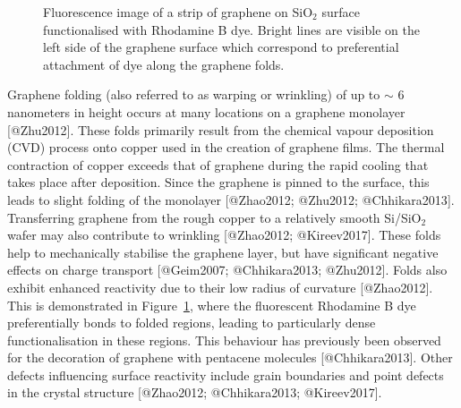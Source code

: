\documentclass[
  letterpaper,
  DIV=11,
  numbers=noendperiod]{scrartcl}
\begin{document}
\begin{figure}


\caption{\label{fig-graphene-folds}Fluorescence image of a strip of
graphene on SiO\(_2\) surface functionalised with Rhodamine B dye.
Bright lines are visible on the left side of the graphene surface which
correspond to preferential attachment of dye along the graphene folds.}

\end{figure}%

Graphene folding (also referred to as warping or wrinkling) of up to
\(\sim\) 6 nanometers in height occurs at many locations on a graphene
monolayer {[}@Zhu2012{]}. These folds primarily result from the chemical
vapour deposition (CVD) process onto copper used in the creation of
graphene films. The thermal contraction of copper exceeds that of
graphene during the rapid cooling that takes place after deposition.
Since the graphene is pinned to the surface, this leads to slight
folding of the monolayer {[}@Zhao2012; @Zhu2012; @Chhikara2013{]}.
Transferring graphene from the rough copper to a relatively smooth
Si/SiO\(_2\) wafer may also contribute to wrinkling {[}@Zhao2012;
@Kireev2017{]}. These folds help to mechanically stabilise the graphene
layer, but have significant negative effects on charge transport
{[}@Geim2007; @Chhikara2013; @Zhu2012{]}. Folds also exhibit enhanced
reactivity due to their low radius of curvature {[}@Zhao2012{]}. This is
demonstrated in Figure~\ref{fig-graphene-folds}, where the fluorescent
Rhodamine B dye preferentially bonds to folded regions, leading to
particularly dense functionalisation in these regions. This behaviour
has previously been observed for the decoration of graphene with
pentacene molecules {[}@Chhikara2013{]}. Other defects influencing
surface reactivity include grain boundaries and point defects in the
crystal structure {[}@Zhao2012; @Chhikara2013; @Kireev2017{]}.
\end{document}
